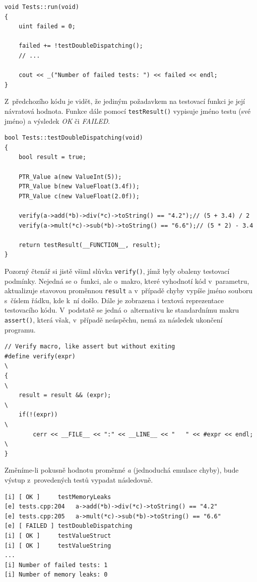 \documentclass[11pt,twoside,a4paper]{book}
\begin{document}
\begin{verbatim}
void Tests::run(void)
{
    uint failed = 0;

    failed += !testDoubleDispatching();
    // ...

    cout << _("Number of failed tests: ") << failed << endl;
}
\end{verbatim}

Z~předchozího kódu je vidět, že jediným požadavkem na testovací funkci je její návratová hodnota. Funkce dále pomocí \texttt{testResult()} vypisuje jméno testu (své jméno) a výsledek \textit{OK} či \textit{FAILED}.

\begin{verbatim}
bool Tests::testDoubleDispatching(void)
{
    bool result = true;

    PTR_Value a(new ValueInt(5));
    PTR_Value b(new ValueFloat(3.4f));
    PTR_Value c(new ValueFloat(2.0f));

    verify(a->add(*b)->div(*c)->toString() == "4.2");// (5 + 3.4) / 2
    verify(a->mult(*c)->sub(*b)->toString() == "6.6");// (5 * 2) - 3.4

    return testResult(__FUNCTION__, result);
}
\end{verbatim}

Pozorný čtenář si jistě všiml slůvka \texttt{verify()}, jímž byly obaleny testovací podmínky. Nejedná se o~funkci, ale o~makro, které vyhodnotí kód v~parametru, aktualizuje stavovou proměnnou \texttt{result} a v~případě chyby vypíše jméno souboru s~číslem řádku, kde k~ní došlo. Dále je zobrazena i textová reprezentace testovacího kódu. V~podstatě se jedná o~alternativu ke standardnímu makru \texttt{assert()}, která však, v~případě neúspěchu, nemá za následek ukončení programu.

\begin{verbatim}
// Verify macro, like assert but without exiting
#define verify(expr)                                                   \
{                                                                      \
    result = result && (expr);                                         \
    if(!(expr))                                                        \
        cerr << __FILE__ << ":" << __LINE__ << "   " << #expr << endl; \
}
\end{verbatim}

Změníme-li pokusně hodnotu proměnné \textit{a} (jednoduchá emulace chyby), bude výstup z~provedených testů vypadat ná\-sle\-dov\-ně.

\begin{verbatim}
[i] [ OK ]     testMemoryLeaks
[e] tests.cpp:204   a->add(*b)->div(*c)->toString() == "4.2"
[e] tests.cpp:205   a->mult(*c)->sub(*b)->toString() == "6.6"
[e] [ FAILED ] testDoubleDispatching
[i] [ OK ]     testValueStruct
[i] [ OK ]     testValueString
...
[i] Number of failed tests: 1
[i] Number of memory leaks: 0
\end{verbatim}
\end{document}
